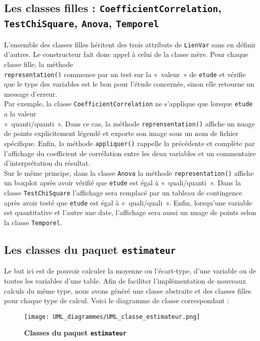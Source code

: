 \documentclass[11pt]{article}
\begin{document}
\subsection*{Les classes filles : \texttt{CoefficientCorrelation}, \texttt{TestChiSquare}, \texttt{Anova}, \texttt{Temporel} }
L'ensemble des classes filles héritent des trois attributs de \texttt{LienVar} sans en définir d'autres. Le constructeur fait donc appel à celui de la classe mère.
Pour chaque classe fille, la méthode
\\
\texttt{representation()} commence par un test sur la «~valeur~» de \texttt{etude} et vérifie que le type des variables est le bon pour l'étude concernée, sinon elle retourne un message d'erreur.\\ Par exemple, la classe \texttt{CoefficientCorrelation} ne s'applique que lorsque \texttt{etude} a la valeur\\ «~quanti/quanti~». Dans ce cas, la méthode \texttt{reprensentation()} affiche un nuage de points explicitement légendé et exporte son image sous un nom de fichier spécifique. Enfin, la méthode \texttt{appliquer()} rappelle la précédente et complète par l'affichage du coefficient de corrélation entre les deux variables et un commentaire d'interprétation du résultat. \\
Sur le même principe, dans la classe \texttt{Anova} la méthode \texttt{representation()} affiche un boxplot après avoir vérifié que \texttt{etude} est égal à «~quali/quanti~». Dans la classe \texttt{TestChiSquare} l'affichage sera remplacé par un tableau de contingence après avoir testé que \texttt{etude} est égal à «~quali/quali~». Enfin, lorsqu'une variable est quantitative et l'autre une date, l'affichage sera aussi un nuage de points selon la classe \texttt{Temporel}. 


\subsection{Les classes du paquet \texttt{estimateur}}

Le but ici est de pouvoir calculer la moyenne ou l'écart-type, d'une variable ou de toutes les variables d'une table. Afin de faciliter l'implémentation de nouveaux calculs du même type, nous avons généré une classe abstraite et des classes filles pour chaque type de calcul. Voici le diagramme de classe correspondant : 
\begin{figure}[H]
    \caption{\textbf{Classes du paquet \texttt{estimateur}}}
    \label{UML_classe_estimateur}
    \centering
    \texttt{[image: UML\_diagrammes/UML\_classe\_estimateur.png]}
\end{figure}
\end{document}
